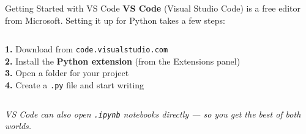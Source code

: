 \documentclass[aspectratio=169]{beamer}
\begin{document}
\begin{frame}{Getting Started with VS Code}
\vspace{0.2cm}
{\small \textbf{VS Code} (Visual Studio Code) is a free editor from Microsoft. Setting it up
for Python takes a few steps:}

\medskip
\begin{columns}[T]
  \vspace{0pt}
  {\small
  \textcolor{wurgreen}{\textbf{1.}} Download from \texttt{code.visualstudio.com}\\[6pt]
  \textcolor{wurgreen}{\textbf{2.}} Install the \textbf{Python extension} (from the Extensions panel)\\[6pt]
  \textcolor{wurgreen}{\textbf{3.}} Open a folder for your project\\[6pt]
  \textcolor{wurgreen}{\textbf{4.}} Create a \texttt{.py} file and start writing}

  \vspace{0pt}
\end{columns}

\medskip
{\small\textcolor{midgray}{\textit{VS Code can also open \texttt{.ipynb} notebooks directly ---
so you get the best of both worlds.}}}
\end{frame}
\end{document}
